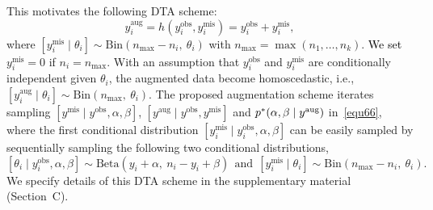 \documentclass[12pt]{article}
\begin{document}
This motivates the following DTA scheme:
\begin{equation}\label{equ7}
y^{\textrm{aug}}_i=h(y^{\textrm{obs}}_i, y^{\textrm{mis}}_i)=y^{\textrm{obs}}_i+y^{\textrm{mis}}_i,
\end{equation}
where $[y^{\textrm{mis}}_i\mid \theta_i]\sim\textrm{Bin}(n_\textrm{max}-n_i,~ \theta_i)$ with $n_{\textrm{max}}=\max(n_1, \ldots, n_k)$. \textcolor{black}{We set} $y^{\textrm{mis}}_i=0$ if $n_i=n_\textrm{max}$. With an assumption that $y^{\textrm{obs}}_i$ and $y^{\textrm{mis}}_i$ are conditionally independent given $\theta_i$, the augmented data become homoscedastic, i.e., $[y^{\textrm{aug}}_i\mid \theta_i]\sim\textrm{Bin}(n_\textrm{max},~ \theta_i)$. The proposed augmentation scheme iterates sampling $[y^{\textrm{mis}}\mid y^{\textrm{obs}}, \alpha, \beta]$,  $[y^{\textrm{aug}} \mid y^{\textrm{obs}},  y^{\textrm{mis}}]$ and $\textcolor{black}{p}^\ast(\alpha, \beta\mid y^{\textrm{aug}})$ in~\eqref{equ66}, where the first conditional distribution $[y^{\textrm{mis}}_i\mid y^{\textrm{obs}}_i, \alpha, \beta]$ can be easily sampled by sequentially sampling  the following two conditional distributions,
\begin{equation}\label{equ8}
[\theta_i\mid y^{\textrm{obs}}_i, \alpha, \beta]\sim\textrm{Beta}(y_i+\alpha,~ n_i-y_i+\beta)~~\textrm{and}~~[y^{\textrm{mis}}_i\mid \theta_i]\sim\textrm{Bin}(n_\textrm{max}-n_i,~ \theta_i).
\end{equation}
We specify details of this DTA scheme in the supplementary material (Section~C).

\end{document}
